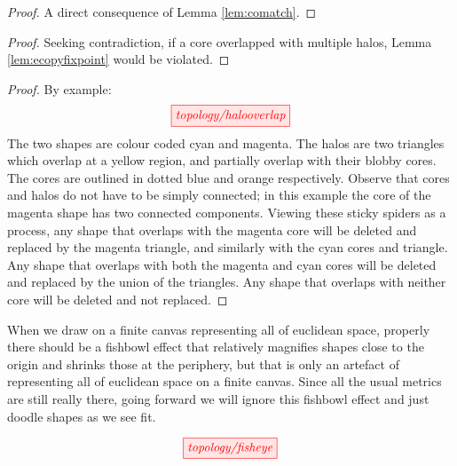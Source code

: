 \begin{fullwidth}
\begin{proposition}
\begin{proof}
A direct consequence of Lemma \ref{lem:comatch}.
\end{proof}
\end{proposition}

\begin{proposition}
\begin{proof}
Seeking contradiction, if a core overlapped with multiple halos, Lemma \ref{lem:ecopyfixpoint} would be violated.
\end{proof}
\end{proposition}

\begin{proposition}
\begin{proof}
By example:
\[\tikzfig{topology/halooverlap}\]
The two shapes are colour coded cyan and magenta. The halos are two triangles which overlap at a yellow region, and partially overlap with their blobby cores. The cores are outlined in dotted blue and orange respectively. Observe that cores and halos do not have to be simply connected; in this example the core of the magenta shape has two connected components. Viewing these sticky spiders as a process, any shape that overlaps with the magenta core will be deleted and replaced by the magenta triangle, and similarly with the cyan cores and triangle. Any shape that overlaps with both the magenta and cyan cores will be deleted and replaced by the union of the triangles. Any shape that overlaps with neither core will be deleted and not replaced.
\end{proof}
\end{proposition}

\begin{remark}
When we draw on a finite canvas representing all of euclidean space, properly there should be a fishbowl effect that relatively magnifies shapes close to the origin and shrinks those at the periphery, but that is only an artefact of representing all of euclidean space on a finite canvas. Since all the usual metrics are still really there, going forward we will ignore this fishbowl effect and just doodle shapes as we see fit.

\[\tikzfig{topology/fisheye}\]
\end{remark}

\newpage


\end{fullwidth}
